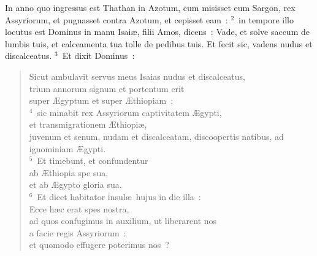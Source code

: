 \lettrine[lines=3,image=true,loversize=0.05,lraise=-0.03]{I}{}n anno quo ingressus est Thathan in Azotum, cum misisset eum Sargon, rex Assyriorum, et pugnasset contra Azotum, et cepisset eam~:
${}^{2}$~in tempore illo locutus est Dominus in manu Isai\ae , filii Amos, dicens~: Vade, et solve saccum de lumbis tuis, et calceamenta tua tolle de pedibus tuis. Et fecit sic, vadens nudus et discalceatus.
${}^{3}$~Et dixit Dominus~: \begin{flushleft}\begin{verse}Sicut ambulavit servus meus Isaias nudus et discalceatus,\\ trium annorum signum et portentum erit\\ super \AE gyptum et super \AE thiopiam~;\\
${}^{4}$~sic minabit rex Assyriorum captivitatem \AE gypti,\\ et transmigrationem \AE thiopi\ae ,\\ juvenum et senum, nudam et discalceatam, discoopertis natibus, ad ignominiam \AE gypti.\\
${}^{5}$~Et timebunt, et confundentur\\ ab \AE thiopia spe sua,\\ et ab \AE gypto gloria sua.\\
${}^{6}$~Et dicet habitator insul\ae\ hujus in die illa~:\\ Ecce h\ae c erat spes nostra,\\ ad quos confugimus in auxilium, ut liberarent nos\\ a facie regis Assyriorum~:\\ et quomodo effugere poterimus nos~?\end{verse}\end{flushleft}



